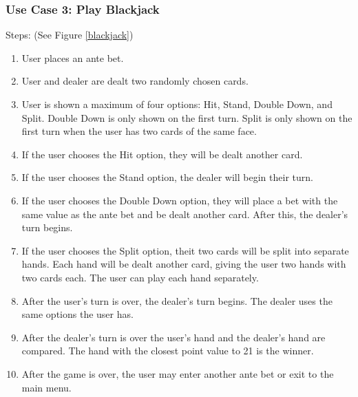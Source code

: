 \documentclass[10pt,conference,onecolumn,compsoc]{IEEEtran}
\begin{document}
\subsubsection{Use Case 3: Play Blackjack}
Steps: (See Figure \ref{blackjack})
\begin{enumerate}
\item User places an ante bet.
\item User and dealer are dealt two randomly chosen cards. 
\item User is shown a maximum of four options: Hit, Stand, Double Down, and Split. Double Down is only shown on the first turn. Split is only shown on the first turn when the user has two cards of the same face.
\item If the user chooses the Hit option, they will be dealt another card.
\item If the user chooses the Stand option, the dealer will begin their turn.
\item If the user chooses the Double Down option, they will place a bet with the same value as the ante bet and be dealt another card. After this, the dealer's turn begins.
\item If the user chooses the Split option, theit two cards will be split into separate hands. Each hand will be dealt another card, giving the user two hands with two cards each. The user can play each hand separately.
\item After the user's turn is over, the dealer's turn begins. The dealer uses the same options the user has.
\item After the dealer's turn is over the user's hand and the dealer's hand are compared. The hand with the closest point value to 21 is the winner.
\item After the game is over, the user may enter another ante bet or exit to the main menu.
\end{enumerate}
\end{document}
